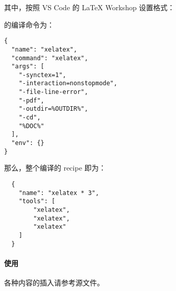 其中，按照 VS Code 的 LaTeX Workshop 设置格式：

{} 的编译命令为：
\begin{verbatim}
{
  "name": "xelatex",
  "command": "xelatex",
  "args": [
    "-synctex=1",
    "-interaction=nonstopmode",
    "-file-line-error",
    "-pdf",
    "-outdir=%OUTDIR%",
    "-cd",
    "%DOC%"
  ],
  "env": {}
}
\end{verbatim}

那么，整个编译的 recipe 即为：

\begin{verbatim}
  {
    "name": "xelatex * 3",
    "tools": [
        "xelatex",
        "xelatex",
        "xelatex"
    ]
  }
\end{verbatim}

\paragraph{使用} 

各种内容的插入请参考源文件。
